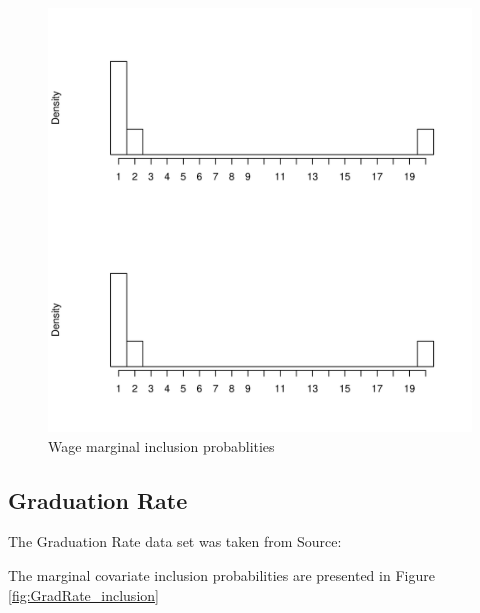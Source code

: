\documentclass{amsart}[12pt]
\begin{document}
\begin{figure}[p]
\label{fig:Wage_inclusion}
\caption{Wage marginal inclusion probablities}
\includegraphics[scale=.4]{Wage_histogram.pdf}
\end{figure}

\subsection{Graduation Rate}
The Graduation Rate data set was taken from Source: \cite{James:2014:ISL:2517747}

The marginal covariate inclusion probabilities are presented in Figure \ref{fig:GradRate_inclusion}

\end{document}
